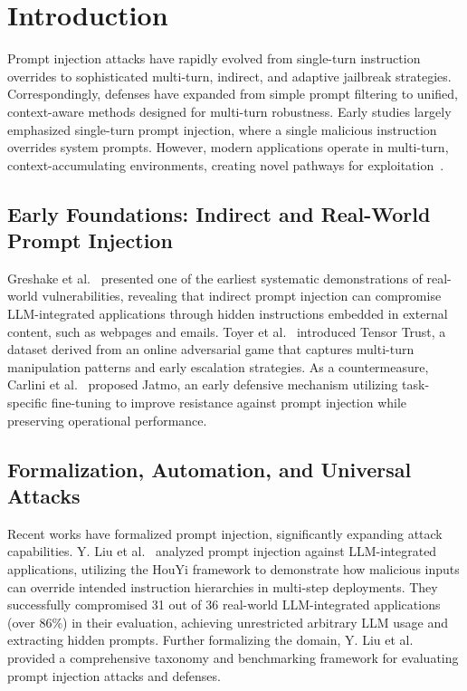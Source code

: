 \documentclass[10pt, a4paper]{article}
\begin{document}
\section{Introduction}

Prompt injection attacks have rapidly evolved from single-turn instruction overrides to sophisticated multi-turn, indirect, and adaptive jailbreak strategies. Correspondingly, defenses have expanded from simple prompt filtering to unified, context-aware methods designed for multi-turn robustness. Early studies largely emphasized single-turn prompt injection, where a single malicious instruction overrides system prompts. However, modern applications operate in multi-turn, context-accumulating environments, creating novel pathways for exploitation~\cite{ha2025, huang2024}.

\subsection{Early Foundations: Indirect and Real-World Prompt Injection}
Greshake et al.~\cite{greshake2023} presented one of the earliest systematic demonstrations of real-world vulnerabilities, revealing that indirect prompt injection can compromise LLM-integrated applications through hidden instructions embedded in external content, such as webpages and emails. Toyer et al.~\cite{toyer2023} introduced Tensor Trust, a dataset derived from an online adversarial game that captures multi-turn manipulation patterns and early escalation strategies. As a countermeasure, Carlini et al.~\cite{carlini2023} proposed Jatmo, an early defensive mechanism utilizing task-specific fine-tuning to improve resistance against prompt injection while preserving operational performance.

\subsection{Formalization, Automation, and Universal Attacks}
Recent works have formalized prompt injection, significantly expanding attack capabilities. Y. Liu et al.~\cite{liu2023houyi} analyzed prompt injection against LLM-integrated applications, utilizing the HouYi framework to demonstrate how malicious inputs can override intended instruction hierarchies in multi-step deployments. They successfully compromised 31 out of 36 real-world LLM-integrated applications (over 86\%) in their evaluation, achieving unrestricted arbitrary LLM usage and extracting hidden prompts. Further formalizing the domain, Y. Liu et al.~\cite{liu2024taxonomy} provided a comprehensive taxonomy and benchmarking framework for evaluating prompt injection attacks and defenses. 
\end{document}
